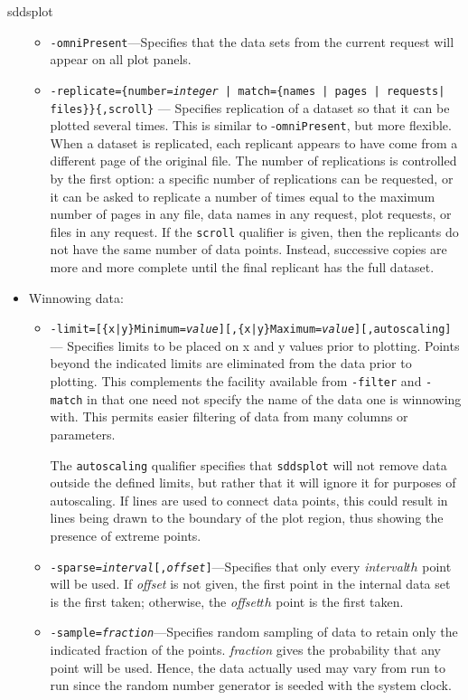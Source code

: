\begin{sddsprog}{sddsplot}
\begin{itemize}
\begin{itemize}
  \item {\tt -omniPresent}---Specifies that the data sets from the current request will appear on all
plot panels.

  \item {\tt -replicate=\{number={\em integer} | match=\{names | pages | requests| files\}\}\{,scroll\}} --- Specifies replication of a dataset so that it can be plotted several times. This is similar to -{\tt omniPresent}, but more flexible.  When a dataset is replicated,
 each replicant appears to have come from a different page of the original file.  The number of replications is controlled by
 the first option: a specific number of replications can be requested, or it can be asked to replicate a number of times 
 equal to the maximum number of pages in any file, data names in any request, plot requests, or files in any request.  
 If the {\tt scroll} qualifier is given, then the replicants do not have the same number of data points.  Instead, successive
 copies are more and more complete until the final replicant has the full dataset.

  \end{itemize}
\item Winnowing data:
  \begin{itemize}
  \item {\tt -limit=[\{x|y\}Minimum={\em value}][,\{x|y\}Maximum={\em value}][,autoscaling]}---
Specifies limits to be placed on x and y values prior to plotting.  Points beyond the indicated limits are 
eliminated from the data prior to plotting.  This complements the facility available from {\tt -filter} and
{\tt -match} in that one need not specify the name of the data one is winnowing with.  This permits easier
filtering of data from many columns or parameters.

The {\tt autoscaling} qualifier specifies that \verb|sddsplot| will not remove data outside the
defined limits, but rather that it will ignore it for purposes of autoscaling.  If lines are used to
connect data points, this could result in lines being drawn to the boundary of the plot region, thus
showing the presence of extreme points.

  \item {\tt -sparse={\em interval}[,{\em offset}]}---Specifies that only every {\em interval}${
{th}}$ point will be used.  If {\em offset} is not given, the first point in the internal data set is
the first taken; otherwise, the {\em offset}${ {th}}$ point is the first taken.

  \item {\tt -sample={\em fraction}}---Specifies random sampling of data to retain only the indicated
fraction of the points.  {\em fraction} gives the probability that any point will be used.  Hence,
the data actually used may vary from run to run since the random number generator is seeded with the
system clock.


\end{itemize}
\end{itemize}
\end{sddsprog}

